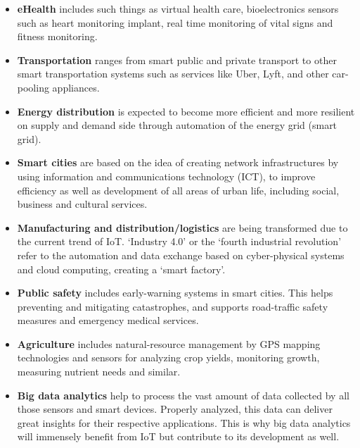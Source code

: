 		\begin{itemize}
			\item \textbf{eHealth} includes such things as virtual health care, bioelectronics sensors such as heart monitoring implant, real time monitoring of vital signs and fitness monitoring.

			\item \textbf{Transportation} ranges from smart public and private transport to other smart transportation systems such as services like Uber, Lyft, and other car-pooling appliances.

			\item \textbf{Energy distribution} is expected to become more efficient and more resilient on supply and demand side through automation of the energy grid (smart grid).

			\item \textbf{Smart cities} are based on the idea of creating network infrastructures by using information and communications technology (ICT), to improve efficiency as well as development of all areas of urban life, including social, business and cultural services.

			\item \textbf{Manufacturing and distribution/logistics} are being transformed due to the current trend of IoT. `Industry 4.0' or the `fourth industrial revolution' refer to the automation and data exchange based on cyber-physical systems and cloud computing, creating a `smart factory'.

			\item \textbf{Public safety} includes early-warning systems in smart cities. This helps preventing and mitigating catastrophes, and supports road-traffic safety measures and emergency medical services.

			\item \textbf{Agriculture} includes natural-resource management by GPS mapping technologies and sensors for analyzing crop yields, monitoring growth, measuring nutrient needs and similar. 

			\item \textbf{Big data analytics} help to process the vast amount of data collected by all those sensors and smart devices. Properly analyzed, this data can deliver great insights for their respective applications. This is why big data analytics will immensely benefit from IoT but contribute to its development as well.
		\end{itemize}
		\vspace{-1em}
